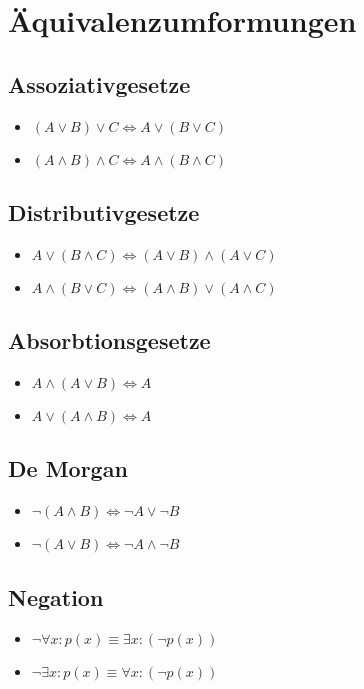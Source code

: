 \documentclass[10pt,a4paper,twoside,twocolumn]{article}
\author{Markus Kasten}
\begin{document}
	\section{Äquivalenzumformungen}
	
	\subsection{Assoziativgesetze}
	\begin{itemize}
		\setlength\itemsep{0em}
		\item $ (A \lor B) \lor C \Leftrightarrow A \lor (B \lor C) $
		\item $ (A \land B) \land C \Leftrightarrow A \land (B \land C) $
	\end{itemize}
	
	\subsection{Distributivgesetze}
	\begin{itemize}
		\setlength\itemsep{0em}
		\item $ A \lor (B \land C) \Leftrightarrow (A \lor B) \land (A \lor C) $
		\item $ A \land (B \lor C) \Leftrightarrow (A \land B) \lor (A \land C) $
	\end{itemize}

	\subsection{Absorbtionsgesetze}
	\begin{itemize}
		\setlength\itemsep{0em}
		\item $ A \land (A \lor B) \Leftrightarrow A $
		\item $ A \lor (A \land B) \Leftrightarrow A $
	\end{itemize}

	\subsection{De Morgan}
	\begin{itemize}
		\setlength\itemsep{0em}
		\item $ \neg (A \land B) \Leftrightarrow \neg A \lor \neg B $
		\item $ \neg (A \lor B) \Leftrightarrow \neg A \land \neg B $
	\end{itemize}

	\subsection{Negation}
	\begin{itemize}
		\setlength\itemsep{0em}
		\item $ \neg \forall x : p(x) \equiv \exists x : (\neg p(x)) $
		\item $ \neg \exists x : p(x) \equiv \forall x : (\neg p(x)) $
	\end{itemize}
\end{document}
